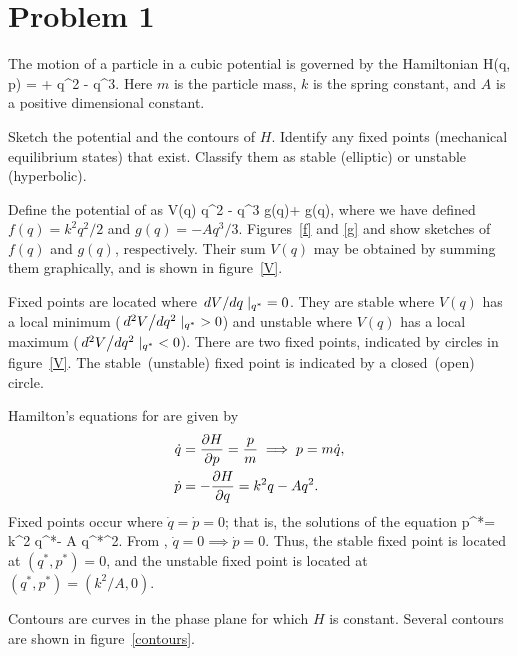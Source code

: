 \newcommand{\qd}{\dot{q}}
\newcommand{\pd}{\dot{p}}
\newcommand{\qs}{q^*}
\newcommand{\ps}{p^*}

\newcommand{\Vq}{V(q)}
\newcommand{\fq}{f(q)}
\newcommand{\gq}{g(q)}

\section{Problem 1}
\begin{statement}
	The motion of a particle in a cubic potential is governed by the Hamiltonian
	\beqn \label{ham1}
		H(q, p) =  +  q^2 -  q^3.
	\eeqn
	Here $m$ is the particle mass, $k$ is the spring constant, and $A$ is a positive dimensional constant.
\end{statement}

\begin{problem}
	Sketch the potential and the contours of $H$.  Identify any fixed points (mechanical equilibrium states) that exist.  Classify them as stable (elliptic) or unstable (hyperbolic).
\end{problem}

\begin{solution}
	Define the potential of  as
	\beqn \label{pot1}
		\Vq \equiv {} q^2 -  q^3 \equiv \gq + \gq,
	\eeqn
	where we have defined $\fq = k^2 q^2 / 2$ and $\gq = -A q^3 / 3$.  Figures~\ref{f} and \ref{g} and show sketches of $\fq$ and $\gq$, respectively.  Their sum $\Vq$ may be obtained by summing them graphically, and is shown in figure~\ref{V}.
	
	Fixed points are located where $\dv*{V}{q} |_{\qs} = 0$.  They are stable where $\Vq$ has a local minimum ($\dv*[2]{V}{q} |_{\qs} > 0$) and unstable where $\Vq$ has a local maximum ($\dv*[2]{V}{q} |_{\qs} < 0$).  There are two fixed points, indicated by circles in figure~\ref{V}.  The stable~(unstable) fixed point is indicated by a closed~(open) circle.

	Hamilton's equations for  are given by
	\begin{align}
		\qd &= \pdv{H}{p} = \frac{p}{m} \implies p = m \qd, \label{x1} \\
		\pd &= -\pdv{H}{q} = k^2 q - A q^2. \notag
	\end{align}
	Fixed points occur where $\qd = \pd = 0$; that is, the solutions of the equation
	\beq
		\ps = k^2 \qs - A {\qs}^2.
	\eeq
	From , $\qd = 0 \implies \pd = 0$.  Thus, the stable fixed point is located at $(\qs, \ps) = 0$, and the unstable fixed point is located at $(\qs, \ps) = (k^2 / A, 0)$.
	
	Contours are curves in the phase plane for which $H$ is constant.  Several contours are shown in figure~\ref{contours}.
\end{solution}

